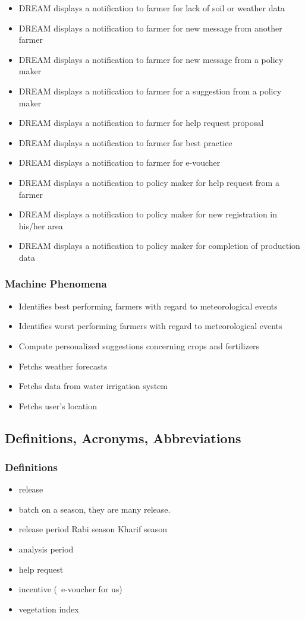 \begin{itemize}
	\item
	DREAM displays a notification to farmer for lack of soil or weather data
	\item
	DREAM displays a notification to farmer for new message from another farmer
	\item
	DREAM displays a notification to farmer for new message from a policy maker
	\item
	DREAM displays a notification to farmer for a suggestion from a policy maker
	\item
	DREAM displays a notification to farmer for help request proposal
	\item
	DREAM displays a notification to farmer for best practice
	\item
	DREAM displays a notification to farmer for e-voucher
	\item
	DREAM displays a notification to policy maker for help request from a farmer
	\item
	DREAM displays a notification to policy maker for new registration in his/her area
	\item
	DREAM displays a notification to policy maker for completion of production data
	
\end{itemize}

\subsubsection{Machine Phenomena}
\begin{itemize}
	\item 
	Identifies best performing farmers with regard to meteorological events
	\item 
	Identifies worst performing farmers with regard to meteorological events
	\item 
	Compute personalized suggestions concerning crops and fertilizers
	\item 
	Fetchs weather forecasts
	\item 
	Fetchs data from water irrigation system
	\item 
	Fetchs user's location
	
\end{itemize}

\subsection{Definitions, Acronyms, Abbreviations}
\subsubsection{Definitions}
\begin{itemize}
	\item release
	\item batch on a season, they are many release.
	\item release period
	\subitem Rabi season
	\subitem Kharif season
	\item analysis period
	\item help request
	\item incentive (~e-voucher for us)
	\item vegetation index
\end{itemize}


